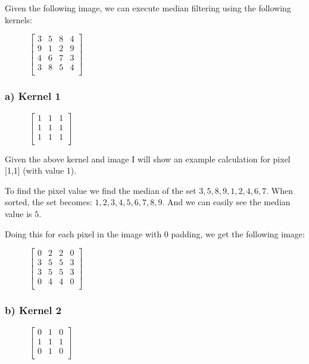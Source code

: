 \documentclass[12pt, letterpaper]{article}
\begin{document}
Given the following image, we can execute median filtering using the following kernels:
\begin{figure}[H]
    \centering
    $\begin{bmatrix}
    3&5&8&4\\
    9&1&2&9\\
    4&6&7&3\\
    3&8&5&4\\
    \end{bmatrix}$
\end{figure}

\subsubsection{a) Kernel 1}

\begin{figure}[H]
    \centering
    $\begin{bmatrix}
    1&1&1\\
    1&1&1\\
    1&1&1\\
    \end{bmatrix}$
\end{figure}

Given the above kernel and image I will show an example calculation for pixel [1,1] (with value 1). 

To find the pixel value we find the median of the set $3,5,8,9,1,2,4,6,7$. When sorted, the set becomes: $1,2,3,4,5,6,7,8,9$. And we can easily see the median value is $5$.

Doing this for each pixel in the image with 0 padding, we get the following image:

\begin{figure}[H]
    \centering
    $\begin{bmatrix}
    0&2&2&0\\
    3&5&5&3\\
    3&5&5&3\\
    0&4&4&0\\
    \end{bmatrix}$
\end{figure}

\subsubsection{b) Kernel 2}

\begin{figure}[H]
    \centering
    $\begin{bmatrix}
    0&1&0\\
    1&1&1\\
    0&1&0\\
    \end{bmatrix}$
\end{figure}
\end{document}
